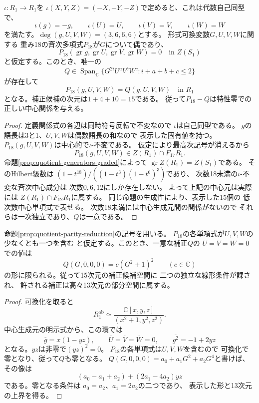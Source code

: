\begin{proposition}[符号対称性による中心関係の低次数化]
\label{prop:quotient-parity-reduction}
$\iota:R_1\to R_1$を
$\iota(X,Y,Z)=(-X,-Y,-Z)$で定めると、これは代数自己同型で、
\[
 \iota(g)=-g,\qquad \iota(U)=U,\qquad
 \iota(V)=V,\qquad \iota(W)=W
\]
を満たす。$\deg(g,U,V,W)=(3,6,6,6)$とする。
形式可換変数$G,U,V,W$に関する
重み18の斉次多項式$P_{18}$が$G$について偶であり、
\[
 P_{18}(\operatorname{gr}g,\operatorname{gr}U,
        \operatorname{gr}V,\operatorname{gr}W)=0
 \quad\text{in }Z(S_1)
\]
と仮定する。このとき、唯一の
\[
 Q\in\operatorname{Span}_{\mathbb C}
 \{G^{2i}U^aV^bW^c:i+a+b+c\le2\}
\]
が存在して
\[
 P_{18}(g,U,V,W)=Q(g,U,V,W)
 \quad\text{in }R_1
\]
となる。補正候補の次元は$1+4+10=15$である。
従って$P_{18}-Q$は特性零での正しい中心関係を与える。
\end{proposition}
\begin{proof}
定義関係式の各辺は同時符号反転で不変なので
$\iota$は自己同型である。
$g$の語長は3と1、$U,V,W$は偶数語長の和なので
表示した固有値を持つ。
$P_{18}(g,U,V,W)$は中心的で$\iota$-不変である。
仮定により最高次記号が消えるから
\[
 P_{18}(g,U,V,W)\in Z(R_1)\cap F_{17}R_1.
\]
命題\ref{prop:quotient-generators-graded}によって
$\operatorname{gr}Z(R_1)=Z(S_1)$である。
そのHilbert級数は
$(1-t^{18})/((1-t^3)(1-t^6)^3)$であり、
次数18未満の$\iota$-不変な斉次中心成分は
次数$0,6,12$にしか存在しない。
よって上記の中心元は実際には
$Z(R_1)\cap F_{12}R_1$に属する。
同じ命題の生成性により、表示した15個の
低次数中心単項式で表せる。
次数18未満には中心生成元間の関係がないので
それらは一次独立であり、$Q$は一意である。
\end{proof}

\begin{proposition}[可換化による補正係数の二条件]
\label{prop:quotient-abelianization-reduction}
命題\ref{prop:quotient-parity-reduction}の記号を用いる。
$P_{18}$の各単項式が$U,V,W$の少なくとも一つを含む
と仮定する。このとき、一意な補正$Q$の
$U=V=W=0$での値は
\[
 Q(G,0,0,0)=c(G^2+1)^2
 \qquad(c\in\mathbb C)
\]
の形に限られる。従って15次元の補正候補空間に
二つの独立な線形条件が課され、
許される補正は高々13次元の部分空間に属する。
\end{proposition}
\begin{proof}
可換化を取ると
\[
 R_1^{\mathrm{ab}}\simeq
 \frac{\mathbb C[x,y,z]}{(x^2+1,y^2,z^2)}.
\]
中心生成元の明示式から、この環では
\[
 \overline g=x(1-yz),\qquad
 \overline U=\overline V=\overline W=0,\qquad
 \overline{g^2}=-1+2yz
\]
となる。$yz$は非零で$(yz)^2=0$。
$P_{18}$の各単項式は$U,V,W$を含むので
可換化で零となり、従って$Q$も零となる。
$Q(G,0,0,0)=a_0+a_1G^2+a_2G^4$と書けば、
その像は
\[
 (a_0-a_1+a_2)+(2a_1-4a_2)yz
\]
である。零となる条件は
$a_0=a_2$、$a_1=2a_2$の二つであり、
表示した形と13次元の上界を得る。
\end{proof}

